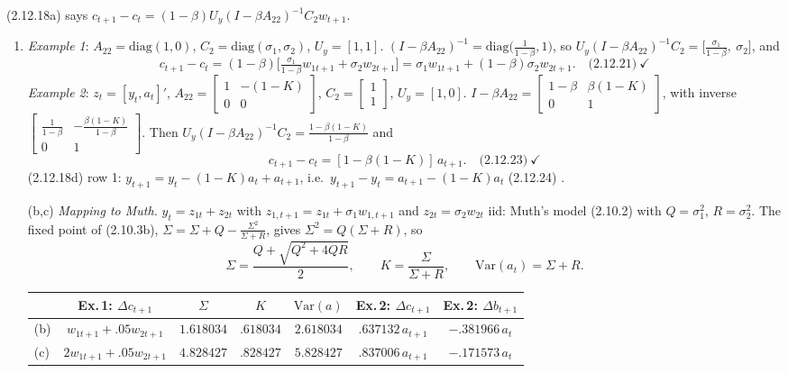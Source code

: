 \documentclass[12pt, letterpaper]{article}
\newcommand{\Var}{\mathrm{Var}}
\begin{document}
\begin{tcolorbox}[oddbox,title={Exercise 2.25 \quad Consumption: the Two Classic Examples}]
(2.12.18a) says $c_{t+1}-c_t=(1-\beta)U_y(I-\beta A_{22})^{-1}C_2w_{t+1}$.
\begin{enumerate}
\item \emph{Example 1}: $A_{22}=\text{diag}(1,0)$, $C_2=\text{diag}(\sigma_1,\sigma_2)$, $U_y=[1,1]$.
$(I-\beta A_{22})^{-1}=\text{diag}\big(\frac1{1-\beta},1\big)$, so
$U_y(I-\beta A_{22})^{-1}C_2=\big[\frac{\sigma_1}{1-\beta},\ \sigma_2\big]$, and
\[
c_{t+1}-c_t=(1-\beta)\Big[\tfrac{\sigma_1}{1-\beta}w_{1t+1}+\sigma_2w_{2t+1}\Big]=\sigma_1w_{1t+1}+(1-\beta)\sigma_2w_{2t+1}.\quad\text{(2.12.21)}\ \checkmark
\]
\emph{Example 2}: $z_t=[y_t,a_t]'$, $A_{22}=\begin{bmatrix}1&-(1-K)\\0&0\end{bmatrix}$,
$C_2=\begin{bmatrix}1\\1\end{bmatrix}$, $U_y=[1,0]$.
$I-\beta A_{22}=\begin{bmatrix}1-\beta&\beta(1-K)\\0&1\end{bmatrix}$, with inverse
$\begin{bmatrix}\frac1{1-\beta}&-\frac{\beta(1-K)}{1-\beta}\\0&1\end{bmatrix}$. Then
$U_y(I-\beta A_{22})^{-1}C_2=\frac{1-\beta(1-K)}{1-\beta}$ and
\[
c_{t+1}-c_t=[1-\beta(1-K)]\,a_{t+1}.\quad\text{(2.12.23)}\ \checkmark
\]
(2.12.18d) row 1: $y_{t+1}=y_t-(1-K)a_t+a_{t+1}$, i.e.\ $y_{t+1}-y_t=a_{t+1}-(1-K)a_t$ (2.12.24) \checkmark.
\item[(b,c)] \emph{Mapping to Muth.} $y_t=z_{1t}+z_{2t}$ with $z_{1,t+1}=z_{1t}+\sigma_1w_{1,t+1}$ and
$z_{2t}=\sigma_2w_{2t}$ iid: Muth's model (2.10.2) with $Q=\sigma_1^2$, $R=\sigma_2^2$. The fixed point
of (2.10.3b), $\Sigma=\Sigma+Q-\frac{\Sigma^2}{\Sigma+R}$, gives $\Sigma^2=Q(\Sigma+R)$, so
\[
\Sigma=\frac{Q+\sqrt{Q^2+4QR}}{2},\qquad K=\frac{\Sigma}{\Sigma+R},\qquad \Var(a_t)=\Sigma+R.
\]
\begin{center}\small
\setlength{\tabcolsep}{4pt}
\begin{tabular}{@{}lcccccc@{}}
\toprule
 & Ex.\,1: $\Delta c_{t+1}$ & $\Sigma$ & $K$ & $\Var(a)$ & Ex.\,2: $\Delta c_{t+1}$ & Ex.\,2: $\Delta b_{t+1}$\\
\midrule
(b) & $w_{1t+1}+.05w_{2t+1}$ & $1.618034$ & $.618034$ & $2.618034$ & $.637132\,a_{t+1}$ & $-.381966\,a_t$\\
(c) & $2w_{1t+1}+.05w_{2t+1}$ & $4.828427$ & $.828427$ & $5.828427$ & $.837006\,a_{t+1}$ & $-.171573\,a_t$\\

\end{tabular}
\end{center}
\end{enumerate}
\end{tcolorbox}
\end{document}
